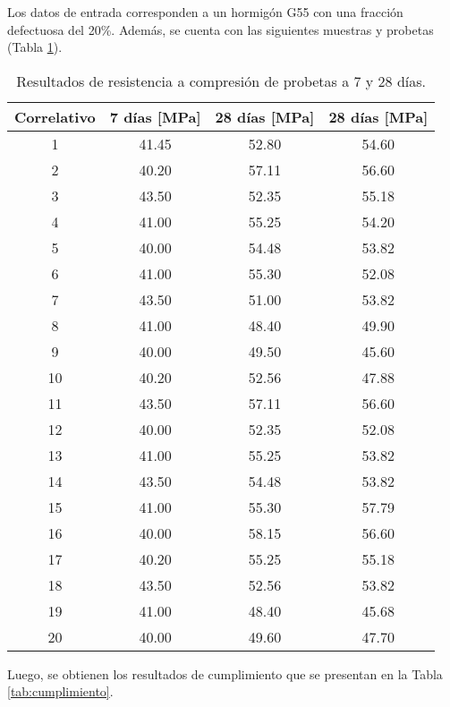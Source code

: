 Los datos de entrada corresponden a un hormigón G55 con una fracción defectuosa del 20\%. Además, se cuenta con las siguientes muestras y probetas (Tabla \ref{tab:datosentrada}).

\begin{table}[H]
\centering
\begin{tabular}{|c|c|c|c|}
\hline
\textbf{Correlativo} & \textbf{7 días [MPa]} & \textbf{28 días [MPa]} & \textbf{28 días [MPa]} \\ \hline
1  & 41.45 & 52.80 & 54.60 \\ \hline
2  & 40.20 & 57.11 & 56.60 \\ \hline
3  & 43.50 & 52.35 & 55.18 \\ \hline
4  & 41.00 & 55.25 & 54.20 \\ \hline
5  & 40.00 & 54.48 & 53.82 \\ \hline
6  & 41.00 & 55.30 & 52.08 \\ \hline
7  & 43.50 & 51.00 & 53.82 \\ \hline
8  & 41.00 & 48.40 & 49.90 \\ \hline
9  & 40.00 & 49.50 & 45.60 \\ \hline
10 & 40.20 & 52.56 & 47.88 \\ \hline
11 & 43.50 & 57.11 & 56.60 \\ \hline
12 & 40.00 & 52.35 & 52.08 \\ \hline
13 & 41.00 & 55.25 & 53.82 \\ \hline
14 & 43.50 & 54.48 & 53.82 \\ \hline
15 & 41.00 & 55.30 & 57.79 \\ \hline
16 & 40.00 & 58.15 & 56.60 \\ \hline
17 & 40.20 & 55.25 & 55.18 \\ \hline
18 & 43.50 & 52.56 & 53.82 \\ \hline
19 & 41.00 & 48.40 & 45.68 \\ \hline
20 & 40.00 & 49.60 & 47.70 \\ \hline
\end{tabular}
\caption{Resultados de resistencia a compresión de probetas a 7 y 28 días.}
\label{tab:datosentrada}
\end{table}

Luego, se obtienen los resultados de cumplimiento que se presentan en la Tabla \ref{tab:cumplimiento}.

